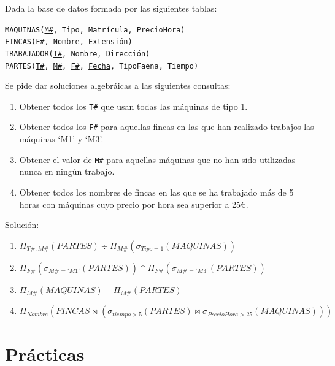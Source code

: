 \documentclass[a4paper]{article}
\begin{document}
Dada la base de datos formada por las siguientes tablas:

\begin{addmargin}[1.5em]{0em}
    \texttt{MÁQUINAS(\underline{M\#}, Tipo, Matrícula, PrecioHora)}\\
    \texttt{FINCAS(\underline{F\#}, Nombre, Extensión)}\\
    \texttt{TRABAJADOR(\underline{T\#}, Nombre, Dirección)}\\
    \texttt{PARTES(\underline{T\#}, \underline{M\#}, \underline{F\#}, \underline{Fecha}, TipoFaena, Tiempo)}
\end{addmargin}

Se pide dar soluciones algebráicas a las siguientes consultas:

\begin{enumerate}
    \item Obtener todos los \texttt{T\#} que usan todas las máquinas de tipo 1.
    \item Obtener todos los \texttt{F\#} para aquellas fincas en las que han realizado trabajos las máquinas `M1' y `M3'.
    \item Obtener el valor de \texttt{M\#} para aquellas máquinas que no han sido utilizadas nunca en ningún trabajo.
    \item Obtener todos los nombres de fincas en las que se ha trabajado más de 5 horas con máquinas cuyo precio por hora sea superior a 25€.
\end{enumerate}

\begin{solution}
    Solución:

    \begin{enumerate}
        \item $\Pi_{T\#,M\#} \left( PARTES \right) \div \Pi_{M\#} \left( \sigma_{Tipo=1} \left( MAQUINAS \right) \right)$
        \item $\Pi_{F\#} \left( \sigma_{M\#='M1'} \left( PARTES \right) \right) \cap \Pi_{F\#} \left( \sigma_{M\#='M3'} \left( PARTES \right) \right)$
        \item $\Pi_{M\#} \left( MAQUINAS \right) - \Pi_{M\#} \left( PARTES \right)$
        \item $\Pi_{Nombre} \left( FINCAS \bowtie \left( \sigma_{tiempo>5} \left( PARTES \right) \bowtie \sigma_{PrecioHora>25} \left( MAQUINAS \right) \right) \right)$
    \end{enumerate}
\end{solution}

\section{Prácticas}
\end{document}
